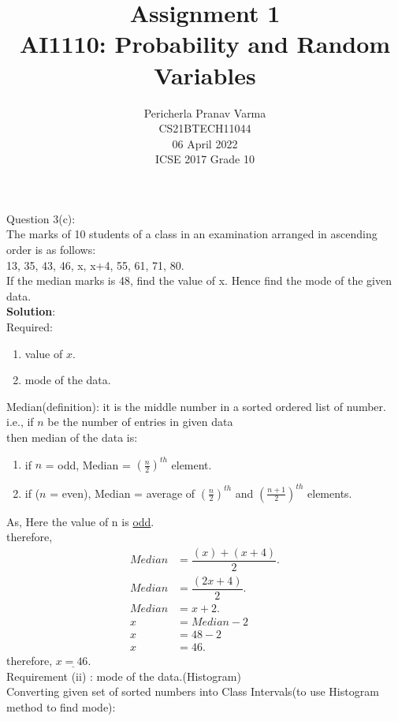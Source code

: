 \documentclass[journal,12pt,twocolumn]{IEEEtran}
\title{Assignment 1 \\ \Large AI1110: Probability and Random Variables \\ }
\author{Pericherla Pranav Varma \\ \normalsize CS21BTECH11044 \\ \vspace*{20pt} \normalsize  06 April 2022 \\ \vspace*{20pt} \Large ICSE 2017 Grade 10}
\begin{document}
\maketitle
\doublespacing
Question 3(c):\\
The marks of 10 students of a class in an examination arranged in ascending order
is as follows:\\
13, 35, 43, 46, x, x+4, 55, 61, 71, 80.\\
If the median marks is 48, find the value of x. Hence find the mode of the given
data.\\[9pt]
\textbf{Solution}:\\[8pt]
Required: 
\begin{enumerate}[label=(\roman*)]		\item value of $x$.
	\item mode of the data.
\end{enumerate}

Median(definition): it is the middle number in a sorted ordered list of number. \\
i.e., if $n$ be the number of entries in given data\\
then median of the data is:\\
\begin{enumerate}[label=(\roman*)]
\item if $n$ = odd, Median = $(\frac{n}{2})^{th}$ element.\\
\item if ($n$ = even), Median = average of $(\frac{n}{2})^{th}$ and $(\frac{n+1}{2})^{th}$ elements.\\[6pt]
\end{enumerate}
As, Here the value of n is \underline{odd}.\\
	therefore,\\
	\begin{align}
	Median &= \dfrac{(x)+(x+4)}{2}.\\
	  Median &= \dfrac{(2x+4)}{2}.\\
	 Median &= x+2.\\
	 x &= Median-2\\
	 x&=48-2\\
	 x&=46.
	\end{align}	
	therefore, $ \underline{x=46.}$ \\[10pt]
Requirement (ii) : mode of the data.(Histogram) \\[4pt]
Converting given set of sorted numbers into Class Intervals(to use Histogram method to find mode):\\[12pt]
\end{document}
